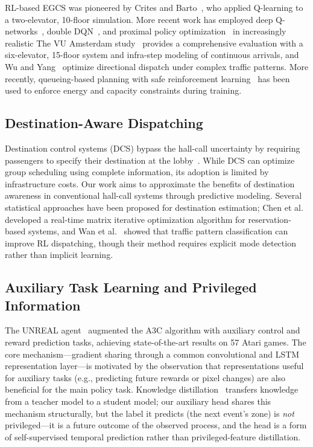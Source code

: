 \documentclass[conference]{IEEEtran}
\begin{document}
RL-based EGCS was pioneered by Crites and Barto~\cite{crites1998elevator},
who applied Q-learning to a two-elevator, 10-floor simulation. More
recent work has employed deep Q-networks~\cite{mnih2015dqn},
double DQN~\cite{van2016deep}, and proximal policy
optimization~\cite{schulman2017ppo} in increasingly realistic
The VU Amsterdam study~\cite{vu2025rl} provides a
comprehensive evaluation with a six-elevator, 15-floor system and
infra-step modeling of continuous arrivals, and Wu and
Yang~\cite{wu2024directional} optimize directional dispatch under
complex traffic patterns. More recently, queueing-based planning
with safe reinforcement learning~\cite{machines2026safe} has been
used to enforce energy and capacity constraints during training.

\subsection{Destination-Aware Dispatching}

Destination control systems (DCS) bypass the hall-call uncertainty by
requiring passengers to specify their destination at the
lobby~\cite{sorsa2022destination}. While DCS can optimize group
scheduling using complete information, its adoption is limited by
infrastructure costs. Our work aims to approximate the benefits of
destination awareness in conventional hall-call systems through
predictive modeling. Several statistical approaches have been
proposed for destination estimation; Chen et al.~\cite{chen2021matrix}
developed a real-time matrix iterative optimization algorithm for
reservation-based systems, and Wan et al.~\cite{wan2024traffic}
showed that traffic pattern classification can improve RL
dispatching, though their method requires explicit mode detection
rather than implicit learning.

\subsection{Auxiliary Task Learning and Privileged Information}

The UNREAL agent~\cite{jaderberg2017unreal} augmented the A3C
algorithm with auxiliary control and reward prediction tasks,
achieving state-of-the-art results on 57 Atari games. The core
mechanism---gradient sharing through a common convolutional and LSTM
representation layer---is motivated by the observation that
representations useful for auxiliary tasks (e.g., predicting future
rewards or pixel changes) are also beneficial for the main policy
task. Knowledge distillation~\cite{hinton2015distilling} transfers
knowledge from a teacher model to a student model; our auxiliary head
shares this mechanism structurally, but the label it predicts (the
next event's zone) is \emph{not} privileged---it is a future
outcome of the observed process, and the head is a form of
self-supervised temporal prediction rather than privileged-feature
distillation.
\end{document}

